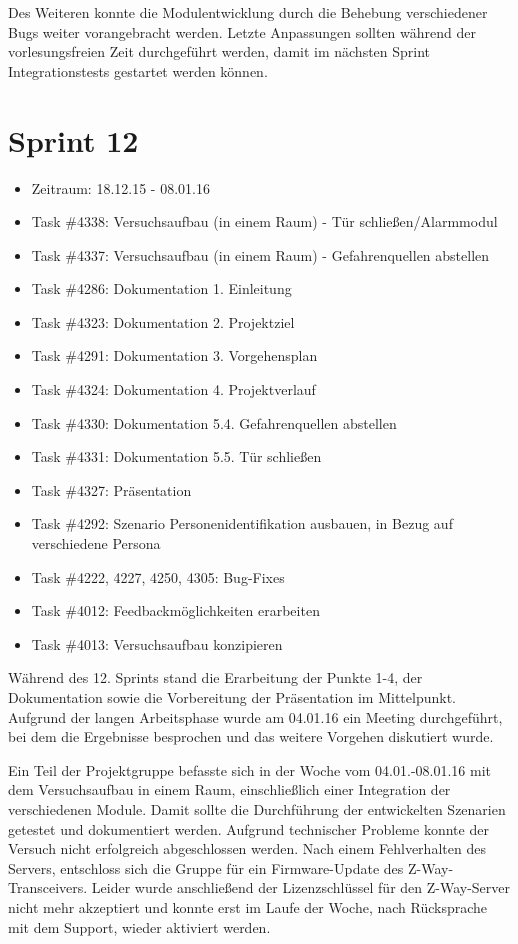 \documentclass[12pt, oneside, smallheadings]{scrbook}
\begin{document}
Des Weiteren konnte die Modulentwicklung durch die Behebung verschiedener Bugs weiter vorangebracht werden. Letzte Anpassungen sollten während der vorlesungsfreien Zeit durchgeführt werden, damit im nächsten Sprint Integrationstests gestartet werden können.

\section{Sprint 12}
\begin{itemize}
	\item Zeitraum: 18.12.15 - 08.01.16 \newline
	\item Task \#4338: Versuchsaufbau (in einem Raum) - Tür schließen/Alarmmodul
	\item Task \#4337: Versuchsaufbau (in einem Raum) - Gefahrenquellen abstellen
	\item Task \#4286: Dokumentation 1. Einleitung
	\item Task \#4323: Dokumentation 2. Projektziel
	\item Task \#4291: Dokumentation 3. Vorgehensplan
	\item Task \#4324: Dokumentation 4. Projektverlauf
	\item Task \#4330: Dokumentation 5.4. Gefahrenquellen abstellen
	\item Task \#4331: Dokumentation 5.5. Tür schließen
	\item Task \#4327: Präsentation
	\item Task \#4292: Szenario Personenidentifikation ausbauen, in Bezug auf verschiedene Persona
	\item Task \#4222, 4227, 4250, 4305: Bug-Fixes
	\item Task \#4012: Feedbackmöglichkeiten erarbeiten
	\item Task \#4013: Versuchsaufbau konzipieren\\
\end{itemize}
\noindent
Während des 12. Sprints stand die Erarbeitung der Punkte 1-4, der Dokumentation sowie die Vorbereitung der Präsentation im Mittelpunkt. Aufgrund der langen Arbeitsphase wurde am 04.01.16 ein Meeting durchgeführt, bei dem die Ergebnisse besprochen und das weitere Vorgehen diskutiert wurde.

Ein Teil der Projektgruppe befasste sich in der Woche vom 04.01.-08.01.16 mit dem Versuchsaufbau in einem Raum, einschließlich einer Integration der verschiedenen Module. Damit sollte die Durchführung der entwickelten Szenarien getestet und dokumentiert werden. Aufgrund technischer Probleme konnte der Versuch nicht erfolgreich abgeschlossen werden. Nach einem Fehlverhalten des Servers, entschloss sich die Gruppe für ein Firmware-Update des Z-Way-Transceivers. Leider wurde anschließend der Lizenzschlüssel für den Z-Way-Server nicht mehr akzeptiert und konnte erst im Laufe der Woche, nach Rücksprache mit dem Support, wieder aktiviert werden.
\end{document}
